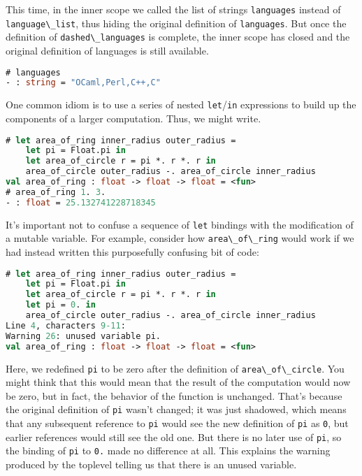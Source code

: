 This time, in the inner scope we called the list of strings
\passthrough{\lstinline!languages!} instead of
\passthrough{\lstinline!language\_list!}, thus hiding the original
definition of \passthrough{\lstinline!languages!}. But once the
definition of \passthrough{\lstinline!dashed\_languages!} is complete,
the inner scope has closed and the original definition of languages is
still available.

\begin{lstlisting}[language=Caml]
# languages
- : string = "OCaml,Perl,C++,C"
\end{lstlisting}

One common idiom is to use a series of nested
\passthrough{\lstinline!let!}/\passthrough{\lstinline!in!} expressions
to build up the components of a larger computation. Thus, we might
write. 

\begin{lstlisting}[language=Caml]
# let area_of_ring inner_radius outer_radius =
    let pi = Float.pi in
    let area_of_circle r = pi *. r *. r in
    area_of_circle outer_radius -. area_of_circle inner_radius
val area_of_ring : float -> float -> float = <fun>
# area_of_ring 1. 3.
- : float = 25.132741228718345
\end{lstlisting}

It's important not to confuse a sequence of
\passthrough{\lstinline!let!} bindings with the modification of a
mutable variable. For example, consider how
\passthrough{\lstinline!area\_of\_ring!} would work if we had instead
written this purposefully confusing bit of code:

\begin{lstlisting}[language=Caml]
# let area_of_ring inner_radius outer_radius =
    let pi = Float.pi in
    let area_of_circle r = pi *. r *. r in
    let pi = 0. in
    area_of_circle outer_radius -. area_of_circle inner_radius
Line 4, characters 9-11:
Warning 26: unused variable pi.
val area_of_ring : float -> float -> float = <fun>
\end{lstlisting}

Here, we redefined \passthrough{\lstinline!pi!} to be zero after the
definition of \passthrough{\lstinline!area\_of\_circle!}. You might
think that this would mean that the result of the computation would now
be zero, but in fact, the behavior of the function is unchanged. That's
because the original definition of \passthrough{\lstinline!pi!} wasn't
changed; it was just shadowed, which means that any subsequent reference
to \passthrough{\lstinline!pi!} would see the new definition of
\passthrough{\lstinline!pi!} as \passthrough{\lstinline!0!}, but earlier
references would still see the old one. But there is no later use of
\passthrough{\lstinline!pi!}, so the binding of
\passthrough{\lstinline!pi!} to \passthrough{\lstinline!0.!} made no
difference at all. This explains the warning produced by the toplevel
telling us that there is an unused variable.

